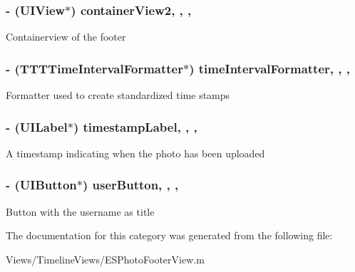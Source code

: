 \subsubsection[{container\+View2}]{\setlength{\rightskip}{0pt plus 5cm}-\/ (U\+I\+View$\ast$) container\+View2\hspace{0.3cm}{\ttfamily [read]}, {\ttfamily [write]}, {\ttfamily [nonatomic]}, {\ttfamily [strong]}}\label{category_e_s_photo_footer_view_07_08_a8b9558c00022f43e0586b65357b01896}
Containerview of the footer \hypertarget{category_e_s_photo_footer_view_07_08_a12ad024d232ef01a3eb70c614958935b}{}
\subsubsection[{time\+Interval\+Formatter}]{\setlength{\rightskip}{0pt plus 5cm}-\/ (T\+T\+T\+Time\+Interval\+Formatter$\ast$) time\+Interval\+Formatter\hspace{0.3cm}{\ttfamily [read]}, {\ttfamily [write]}, {\ttfamily [nonatomic]}, {\ttfamily [strong]}}\label{category_e_s_photo_footer_view_07_08_a12ad024d232ef01a3eb70c614958935b}
Formatter used to create standardized time stamps \hypertarget{category_e_s_photo_footer_view_07_08_a4d72671edc6d9232f5134ed7c4139539}{}
\subsubsection[{timestamp\+Label}]{\setlength{\rightskip}{0pt plus 5cm}-\/ (U\+I\+Label$\ast$) timestamp\+Label\hspace{0.3cm}{\ttfamily [read]}, {\ttfamily [write]}, {\ttfamily [nonatomic]}, {\ttfamily [strong]}}\label{category_e_s_photo_footer_view_07_08_a4d72671edc6d9232f5134ed7c4139539}
A timestamp indicating when the photo has been uploaded \hypertarget{category_e_s_photo_footer_view_07_08_ae9d068f07ff4b608a3bb09514216307a}{}
\subsubsection[{user\+Button}]{\setlength{\rightskip}{0pt plus 5cm}-\/ (U\+I\+Button$\ast$) user\+Button\hspace{0.3cm}{\ttfamily [read]}, {\ttfamily [write]}, {\ttfamily [nonatomic]}, {\ttfamily [strong]}}\label{category_e_s_photo_footer_view_07_08_ae9d068f07ff4b608a3bb09514216307a}
Button with the username as title 

The documentation for this category was generated from the following file\+:\begin{DoxyCompactItemize}
\item 
Views/\+Timeline\+Views/E\+S\+Photo\+Footer\+View.\+m\end{DoxyCompactItemize}
